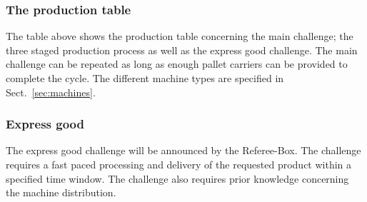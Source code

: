 \documentclass[12pt,twoside]{article}
\begin{document}







\subsubsection{The production table}

The table above shows the production table concerning the main
challenge; the three staged production process as well as the express
good challenge. The main challenge can be repeated as long as enough
pallet carriers can be provided to complete the cycle. The different
machine types are specified in Sect.~\ref{sec:machines}.


\subsubsection{Express good}

The express good challenge will be announced by the Referee-Box. The challenge
requires a fast paced processing and delivery of the requested product within
a specified time window. The challenge also requires prior knowledge
concerning the machine distribution.
\end{document}
